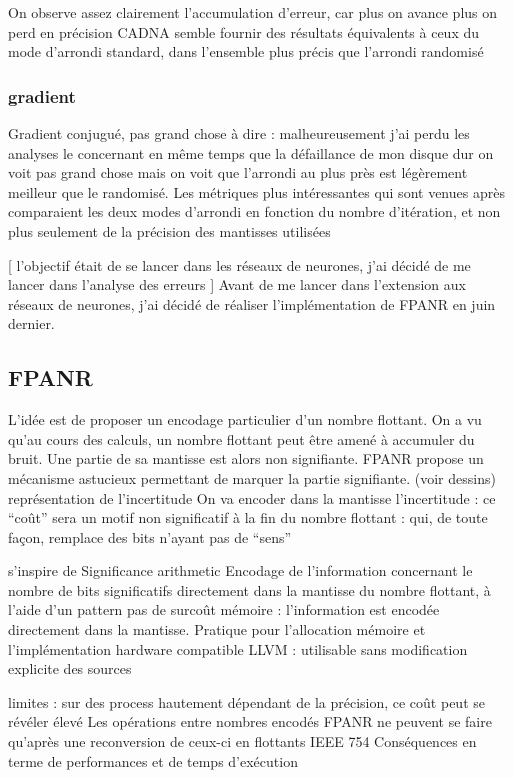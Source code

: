 \documentclass[a4paper,11pt]{article}
\begin{document}
On observe assez clairement l’accumulation d’erreur, car plus on avance plus on perd en précision 
CADNA semble fournir des résultats équivalents à ceux du mode d’arrondi standard, dans l’ensemble plus précis que l’arrondi randomisé

\subsubsection{gradient}
Gradient conjugué, pas grand chose à dire : malheureusement j’ai perdu les analyses le concernant en même temps que la défaillance de mon disque dur
on voit pas grand chose mais on voit que l’arrondi au plus près est légèrement meilleur que le randomisé.
Les métriques plus intéressantes qui sont venues après comparaient les deux modes d’arrondi en fonction du nombre d’itération, et non plus seulement de la précision des mantisses utilisées

[ l’objectif était de se lancer dans les réseaux de neurones, j’ai décidé de me lancer dans l’analyse des erreurs ]
Avant de me lancer dans l’extension aux réseaux de neurones, j’ai décidé de réaliser l’implémentation de FPANR en juin dernier.

\subsection{ FPANR }
L’idée est de proposer un encodage particulier d’un nombre flottant.
On a vu qu’au cours des calculs, un nombre flottant peut être amené à accumuler du bruit. Une partie de sa mantisse est alors non signifiante.
FPANR propose un mécanisme astucieux permettant de marquer la partie signifiante. (voir dessins) représentation de l’incertitude
On va encoder dans la mantisse l’incertitude : ce “coût” sera un motif non significatif à la fin du nombre flottant : qui, de toute façon, remplace des bits n’ayant pas de “sens”


s’inspire de Significance arithmetic
Encodage de l’information concernant  le nombre de bits significatifs directement dans la mantisse du nombre flottant, à l’aide d’un pattern
pas de surcoût mémoire : l’information est encodée directement dans la mantisse. Pratique pour l’allocation mémoire et l’implémentation hardware
compatible 
LLVM : utilisable sans modification explicite des sources

limites : sur des process hautement dépendant de la précision, ce coût peut se révéler élevé
Les opérations entre nombres encodés FPANR ne peuvent se faire qu’après une reconversion de ceux-ci en flottants IEEE 754
Conséquences en terme de performances et de temps d’exécution
\end{document}
